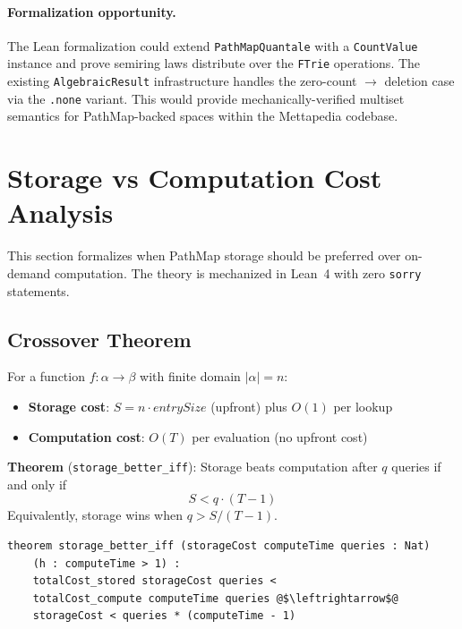 \documentclass[11pt]{article}
\theoremstyle{definition}
\theoremstyle{remark}
\newcommand{\PathMap}{\textup{PathMap}}
\begin{document}
\paragraph{Formalization opportunity.}
The Lean formalization could extend \texttt{PathMapQuantale} with a
\texttt{CountValue} instance and prove semiring laws distribute over
the \texttt{FTrie} operations.  The existing \texttt{AlgebraicResult}
infrastructure handles the zero-count $\to$ deletion case via the
\texttt{.none} variant.  This would provide mechanically-verified
multiset semantics for \PathMap{}-backed spaces within the Mettapedia
codebase.

\section{Storage vs Computation Cost Analysis}
\label{sec:cost-analysis}

This section formalizes when \PathMap{} storage should be preferred over
on-demand computation.  The theory is mechanized in Lean~4 with zero
\texttt{sorry} statements.

\subsection{Crossover Theorem}

For a function $f : \alpha \to \beta$ with finite domain $|\alpha| = n$:

\begin{itemize}
  \item \textbf{Storage cost}: $S = n \cdot \textit{entrySize}$ (upfront)
    plus $O(1)$ per lookup
  \item \textbf{Computation cost}: $O(T)$ per evaluation (no upfront cost)
\end{itemize}

\noindent
\textbf{Theorem} (\texttt{storage\_better\_iff}):
Storage beats computation after $q$ queries if and only if
\[
  S < q \cdot (T - 1)
\]
\noindent
Equivalently, storage wins when $q > S / (T - 1)$.

\begin{lstlisting}
theorem storage_better_iff (storageCost computeTime queries : Nat)
    (h : computeTime > 1) :
    totalCost_stored storageCost queries <
    totalCost_compute computeTime queries @$\leftrightarrow$@
    storageCost < queries * (computeTime - 1)
\end{lstlisting}
\end{document}
